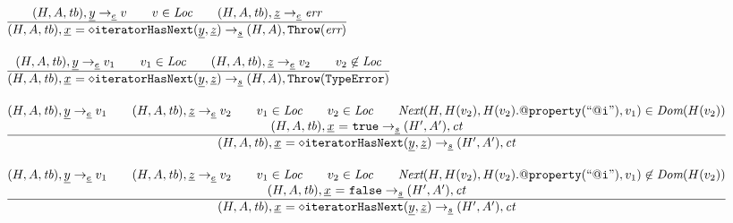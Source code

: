 \documentclass[a4paper, leqno]{amsart}
\newcommand{\rulesep}{\quad\quad}
\newcommand{\stmt}{s}
\newcommand{\expr}{e}
\newcommand{\ir}[1]{\ensuremath{\underline{#1}}}
\newcommand{\irid}{\ir{x}}
\newcommand{\false}{{\tt false}}
\newcommand{\true}{{\tt true}}
\newcommand{\tb}{\emph{tb}}
\newcommand{\err}{\emph{err}}
\newcommand{\te}{{\tt TypeError}}
\newcommand{\Loc}{\emph{Loc}}
\newcommand{\ct}{\emph{ct}}
\newcommand{\hf}[1]{\emph{#1}}
\newcommand{\error}{\ensuremath{{\tt Throw}(\err)}}
\newcommand{\thte}{\ensuremath{{\tt Throw}(\te)}}
\newcommand{\state}{\ensuremath{(H,A,\tb)}}
\newcommand{\res}{\ensuremath{(H,A)}}
\newcommand{\resp}{\ensuremath{(H',A')}}
\newcommand{\evale}{\ensuremath{(H,A,\tb)}}
\begin{document}
\[\begin{array}{l@{~~}l@{~~}ll}
\frac{\begin{matrix}
\evale, \ir{y} \rightarrow_{\ir\expr} v
\rulesep
v\in\Loc
\rulesep
\evale, \ir{z} \rightarrow_{\ir\expr} \err
\end{matrix}}{\begin{matrix}
\state, \irid \ {\tt = {\diamond}iteratorHasNext}(\ir{y}, \ir{z})  \rightarrow_{\ir\stmt} \res, \error
\end{matrix}}
\\[2em]

\frac{\begin{matrix}
\evale, \ir{y} \rightarrow_{\ir\expr} v_1
\rulesep
v_1\in\Loc
\rulesep
\evale, \ir{z} \rightarrow_{\ir\expr} v_2
\rulesep
v_2\not\in\Loc
\end{matrix}}{\begin{matrix}
\state, \irid \ {\tt = {\diamond}iteratorHasNext}(\ir{y}, \ir{z})  \rightarrow_{\ir\stmt} \res, \thte
\end{matrix}}
\\[2em]

\frac{\begin{matrix}
\evale, \ir{y} \rightarrow_{\ir\expr} v_1
\rulesep
\evale, \ir{z} \rightarrow_{\ir\expr} v_2
\rulesep
v_1\in\Loc
\rulesep
v_2\in\Loc
\rulesep
\hf{Next}(H, H(v_2), H(v_2).{\tt@property}({\tt``@i"}),v_1)%
\in\hf{Dom}(H(v_2))
\\
\state, \irid \ {\tt =} \ \true \rightarrow_{\ir\stmt} \resp, \ct
\end{matrix}}{\begin{matrix}
\state, \irid \ {\tt = {\diamond}iteratorHasNext}(\ir{y}, \ir{z})  \rightarrow_{\ir\stmt} \resp, \ct
\end{matrix}}
\\[2em]

\frac{\begin{matrix}
\evale, \ir{y} \rightarrow_{\ir\expr} v_1
\rulesep
\evale, \ir{z} \rightarrow_{\ir\expr} v_2
\rulesep
v_1\in\Loc
\rulesep
v_2\in\Loc
\rulesep
\hf{Next}(H, H(v_2), H(v_2).{\tt@property}({\tt``@i"}),v_1)%
\not\in\hf{Dom}(H(v_2))
\\
\state, \irid \ {\tt =} \ \false \rightarrow_{\ir\stmt} \resp, \ct
\end{matrix}}{\begin{matrix}
\state, \irid \ {\tt = {\diamond}iteratorHasNext}(\ir{y}, \ir{z})  \rightarrow_{\ir\stmt} \resp, \ct
\end{matrix}}
\\[2em]


\end{array}\]
\end{document}
